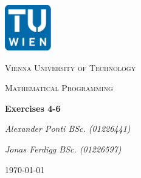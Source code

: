 
\begin{titlepage}
	\centering
	\includegraphics[width=0.15\textwidth]{./img/logo_tuwien.png}\par\vspace{1cm}
	{\scshape\LARGE Vienna University of Technology \par}
	\vspace{1cm}
	{\scshape\Large Mathematical Programming \par}
	\vspace{1.5cm}
	{\huge\bfseries Exercises 4-6   \par}
	\vspace{2cm}
	{\Large\itshape Alexander Ponti BSc. (01226441) \par}
	{\Large\itshape Jonas Ferdigg BSc. (01226597) \par}
	\vfill
	\vspace*{1ex}
	{\large \today\par}
\end{titlepage}


